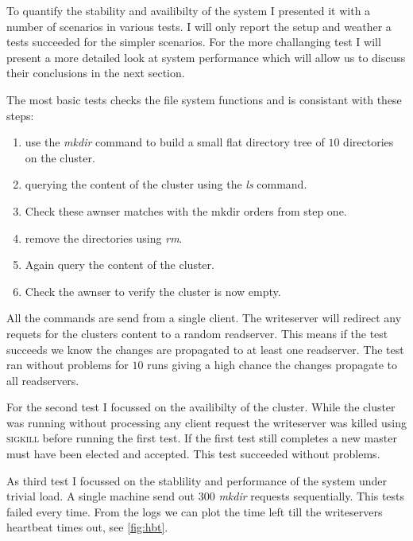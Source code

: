 To quantify the stability and availibilty of the system I presented it with a number of scenarios in various tests. I will only report the setup and weather a tests succeeded for the simpler scenarios. For the more challanging test I will present a more detailed look at system performance which will allow us to discuss their conclusions in the next section.

The most basic tests checks the file system functions and is consistant with these steps: 
\begin{enumerate}
	\item use the \textit{mkdir} command to build a small flat directory tree of $10$ directories on the cluster.
	\item querying the content of the cluster using the \textit{ls} command. 
	\item Check these awnser matches with the mkdir orders from step one.
	\item remove the directories using \textit{rm}.
	\item Again query the content of the cluster.
	\item Check the awnser to verify the cluster is now empty.
\end{enumerate}
All the commands are send from a single client. The writeserver will redirect any requets for the clusters content to a random readserver. This means if the test succeeds we know the changes are propagated to at least one readserver. The test ran without problems for $10$ runs giving a high chance the changes propagate to all readservers.

For the second test I focussed on the availibilty of the cluster. While the cluster was running without processing any client request the writeserver was killed using \textsc{sigkill} before running the first test. If the first test still completes a new master must have been elected and accepted. This test succeeded without problems.

As third test I focussed on the stablility and performance of the system under trivial load. A single machine send out $300$ \textit{mkdir} requests sequentially. This tests failed every time. From the logs we can plot the time left till the writeservers heartbeat times out, see \cref{fig:hbt}.


